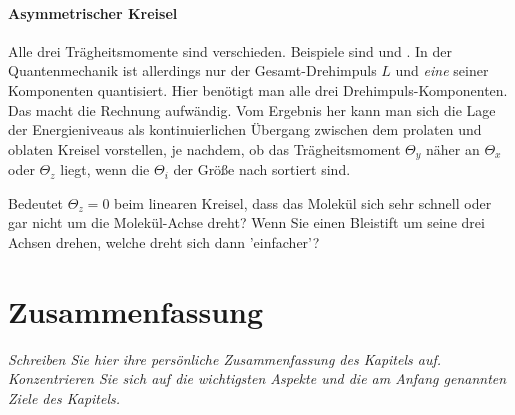 \paragraph{Asymmetrischer Kreisel} Alle drei Trägheitsmomente sind verschieden. Beispiele sind  und . In der Quantenmechanik ist allerdings nur der Gesamt-Drehimpuls $L$ und \emph{eine} seiner Komponenten quantisiert. Hier benötigt man alle drei Drehimpuls-Komponenten. Das macht die Rechnung aufwändig. Vom Ergebnis her kann man sich die Lage der Energieniveaus als kontinuierlichen Übergang zwischen dem prolaten und oblaten Kreisel vorstellen, je nachdem, ob das Trägheitsmoment $\Theta_y$ näher an $\Theta_x$ oder $\Theta_z$ liegt, wenn die $\Theta_i$ der Größe nach sortiert sind.
\begin{marginfigure}
\end{marginfigure}


\begin{questions} 
\item Bedeutet $\Theta_z = 0$ beim linearen Kreisel, dass das Molekül sich sehr schnell oder gar nicht um die Molekül-Achse dreht? Wenn Sie einen Bleistift um seine drei Achsen drehen, welche dreht sich dann 'einfacher'?
\end{questions}

\newpage

\section{Zusammenfassung}

\textit{Schreiben Sie hier ihre persönliche Zusammenfassung des Kapitels auf. Konzentrieren Sie sich auf die wichtigsten Aspekte und die am Anfang genannten Ziele des Kapitels.}

\vspace*{10cm}




\printbibliography[segment=\therefsegment,heading=subbibliography]
